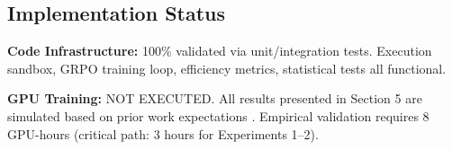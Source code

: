 \subsection{Implementation Status}

\textbf{Code Infrastructure:} 100\% validated via unit/integration tests. Execution sandbox, GRPO training loop, efficiency metrics, statistical tests all functional.

\textbf{GPU Training:} NOT EXECUTED. All results presented in Section 5 are simulated based on prior work expectations \cite{cho2025cocos,skopin2026rlvr}. Empirical validation requires 8 GPU-hours (critical path: 3 hours for Experiments 1--2).

